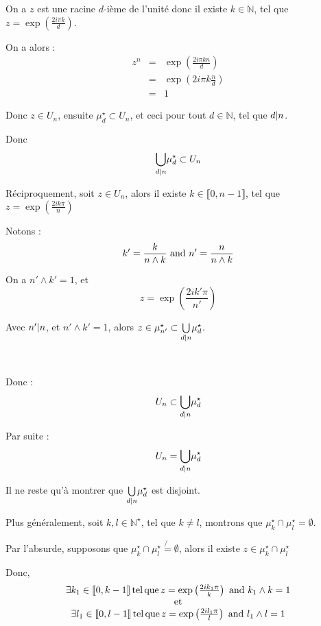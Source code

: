 On a $z$ est une racine $d$-i{\`e}me de l'unit{\'e} donc il existe $k \in
\mathbb{N}$, tel que $z = \exp \left( \frac{2 i \pi k}{d} \right)$.

On a alors :
\begin{eqnarray*}
  z^n & = & \exp \left( \frac{2 i \pi k n}{d} \right)\\
  & = & \exp \left( 2 i \pi k \frac{n}{d} \right)\\
  & = & 1
\end{eqnarray*}


Donc $z \in U_n$, ensuite $\mu_d^{\star} \subset U_n$, et ceci pour tout $d
\in \mathbb{N}$, tel que $d | n $.

Donc
\[ \underset{d | n }{\bigcup} \mu_d^{\star} \subset U_n \]


R{\'e}ciproquement, soit $z \in U_n$, alors il existe $k \in \llbracket 0, n -
1 \rrbracket$, tel que $z = \exp \left( \frac{2 i k \pi}{n} \right)$

Notons :
\[ k' = \frac{k}{n \wedge k} \text{ and } n' = \frac{n}{n \wedge k} \]


On a $n' \wedge k' = 1$, et
\[ z = \exp \left( \frac{2 i k' \pi}{n'} \right) \]


Avec $n' | n $, et $n' \wedge k' = 1$, alors $z \in \mu_{n'}^{\star}
\subset \underset{d | n }{\bigcup} \mu_d^{\star}$.

\

Donc :
\[ U_n \subset \underset{d | n }{\bigcup} \mu_d^{\star} \]


Par suite :
\[ U_n = \underset{d | n }{\bigcup} \mu_d^{\star} \]


Il ne reste qu'{\`a} montrer que $\underset{d | n }{\bigcup}
\mu_d^{\star}$ est disjoint.

Plus g{\'e}n{\'e}ralement, soit $k, l \in \mathbb{N}^{\star}$, tel que $k \neq
l$, montrons que $\mu_k^{\star} \cap \mu_l^{\star} = \emptyset$.

Par l'absurde, supposons que $\mu_k^{\star} \cap \mu_l^{\star} \not{=}
\emptyset$, alors il existe $z \in \mu_k^{\star} \cap \mu_l^{\star}$

Donc,
\[ \begin{array}{c}
     \exists k_1 \in \llbracket 0, k - 1 \rrbracket \operatorname{tel} \operatorname{que} z =
     \exp \left( \frac{2 i k_1 \pi}{k} \right) \text{ and } k_1 \wedge k = 1\\
     \operatorname{et}\\
     \exists l_1 \in \llbracket 0, l - 1 \rrbracket \operatorname{tel} \operatorname{que} z =
     \exp \left( \frac{2 i l_1 \pi}{l} \right) \text{ and } l_1 \wedge l = 1
   \end{array} \]


